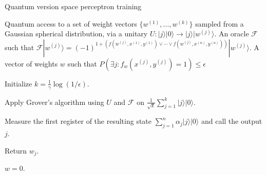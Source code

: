 \documentclass{article}
\begin{document}
\pagestyle{empty}
\begin{algorithm}[ht]
	\caption{Quantum version space perceptron training} 
	\begin{algorithmic}[1]
	\Require Quantum access to a set of weight vectors $\{w^{(1)}, \ldots, w^{(k)}\}$ sampled from a Gaussian spherical distribution, via a unitary $U: |j\rangle|{0}\rangle \rightarrow |j\rangle|w^{(j)}\rangle$. An oracle $\mathcal{F}$ such that $\mathcal{F}|w^{(j)}\rangle=(-1)^{1+\left(f\left(w^{(j)},x^{(1)}, y^{(1)}\right) \vee \cdots \vee f\left(w^{(j)},x^{(n)}, y^{(n)}\right)\right)}|w^{(j)}\rangle$.
    \Ensure A vector of weights $w$ such that $P\left(\exists j: f_{w}\left(x^{(j)}, y^{(j)}\right)=1\right) \leq \epsilon$

		\State Initialize $k = \frac{1}{\gamma}\log(1/\epsilon)$.
		
			\State Apply Grover's algorithm using $U$ and $\mathcal{F}$ on $\frac{1}{\sqrt{k}}\sum_{j=1}^{k} |j\rangle|0\rangle$.
						
			\State Measure the first register of the resulting state $\sum_{j=1}^{n} \alpha_j|j\rangle|0\rangle$ and call the output $j$.
			
			
				\State Return $w_j$.
			
			\EndIf
					
		\EndFor
		
		\State \Return $w=0$.
	\end{algorithmic}
\end{algorithm}
\end{document}
